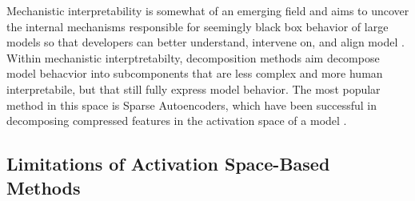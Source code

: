 \documentclass{article}
\theoremstyle{plain}
\theoremstyle{definition}
\theoremstyle{remark}
\begin{document}
Mechanistic interpretability is somewhat of an emerging field and aims to uncover the internal mechanisms responsible for seemingly black box behavior of large models so that developers can better understand, intervene on, and align model \cite{bereska2024mechanistic}. Within mechanistic interptretabilty, decomposition methods aim decompose model behacvior into subcomponents that are less complex and more human interpretabile, but that still fully express model behavior. The most popular method in this space is Sparse Autoencoders, which have been successful in decomposing compressed features in the activation space of a model \cite{gao2024scaling,cunningham2023sparse,bricken2023towards}.

\subsection{Limitations of Activation Space-Based Methods}



\end{document}
